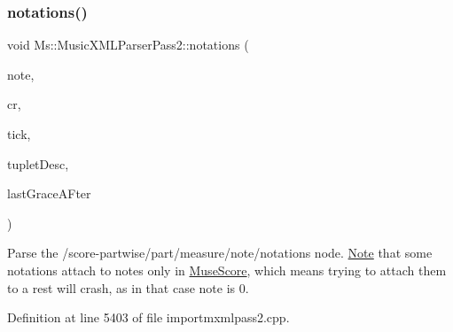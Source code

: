 \mbox{\label{class_ms_1_1_music_x_m_l_parser_pass2_ab712c5ff2628853b9071ef50a3b84bc4}} 
\subsubsection{\texorpdfstring{notations()}{notations()}}
{\footnotesize\ttfamily void Ms\+::\+Music\+X\+M\+L\+Parser\+Pass2\+::notations (\begin{DoxyParamCaption}\item[{\hyperlink{class_ms_1_1_note}{Note} $\ast$}]{note,  }\item[{\hyperlink{class_ms_1_1_chord_rest}{Chord\+Rest} $\ast$}]{cr,  }\item[{const int}]{tick,  }\item[{\hyperlink{struct_ms_1_1_music_xml_tuplet_desc}{Music\+Xml\+Tuplet\+Desc} \&}]{tuplet\+Desc,  }\item[{bool \&}]{last\+Grace\+A\+Fter }\end{DoxyParamCaption})}

Parse the /score-\/partwise/part/measure/note/notations node. \hyperlink{class_ms_1_1_note}{Note} that some notations attach to notes only in \hyperlink{class_ms_1_1_muse_score}{Muse\+Score}, which means trying to attach them to a rest will crash, as in that case note is 0. 

Definition at line 5403 of file importmxmlpass2.\+cpp.

\mbox{\label{class_ms_1_1_music_x_m_l_parser_pass2_acc37a226f30b5759c9ce8306b780b2fc}} 
